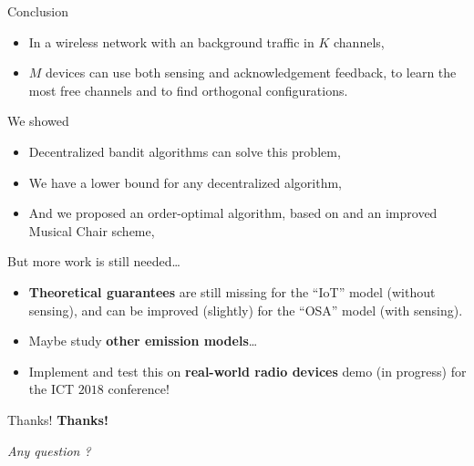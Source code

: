 \documentclass[12pt,english,ignorenonframetext,aspectratio=169,]{beamer}
\providecommand{\tightlist}{%
  \setlength{\itemsep}{0pt}\setlength{\parskip}{0pt}}
\begin{document}
\begin{frame}[allowframebreaks]{Conclusion}

\begin{itemize}
\tightlist
\item
  In a wireless network with an \iid{} background traffic in \(K\)
  channels,
\item
  \(M\) devices can use both sensing and acknowledgement feedback, to
  learn the most free channels and to find orthogonal configurations.
\end{itemize}

\begin{block}{We showed \Smiley[1.2]}

\begin{itemize}
\tightlist
\item
  Decentralized bandit algorithms can solve this problem,
\item
  We have a lower bound for any decentralized algorithm,
\item
  And we proposed an order-optimal algorithm, based on \klUCB{} and an
  improved Musical Chair scheme, \MCTopM
\end{itemize}

\end{block}

\begin{block}{But more work is still needed\ldots{} \Sey[1.2]}

\begin{itemize}
\tightlist
\item
  \textbf{Theoretical guarantees} are still missing for the ``IoT''
  model (without sensing), and can be improved (slightly) for the
  ``OSA'' model (with sensing).
\item
  Maybe study \textbf{other emission models}\ldots{}
\item
  Implement and test this on \textbf{real-world radio devices}
  \hook demo (in progress) for the ICT \(2018\) conference!
\end{itemize}

\end{block}

\vspace*{10pt}

\begin{center}\begin{LARGE}
  \ifxetex
    {\Fontify Thanks!} \Smiley[1.2]
  \else
    \textbf{Thanks!} \Smiley[1.2]
  \fi
\end{LARGE}\end{center}

\begin{center}\begin{Large}
  \emph{Any question ?}
\end{Large}\end{center}

\end{frame}
\end{document}
